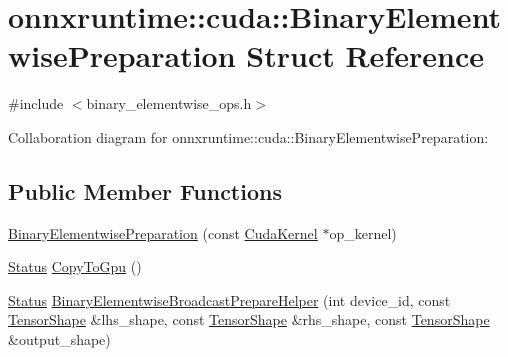 \hypertarget{structonnxruntime_1_1cuda_1_1BinaryElementwisePreparation}{}\section{onnxruntime\+:\+:cuda\+:\+:Binary\+Elementwise\+Preparation Struct Reference}
\label{structonnxruntime_1_1cuda_1_1BinaryElementwisePreparation}


{\ttfamily \#include $<$binary\+\_\+elementwise\+\_\+ops.\+h$>$}



Collaboration diagram for onnxruntime\+:\+:cuda\+:\+:Binary\+Elementwise\+Preparation\+:
\subsection*{Public Member Functions}
\begin{DoxyCompactItemize}
\item 
\mbox{\hyperlink{structonnxruntime_1_1cuda_1_1BinaryElementwisePreparation_a36f2903469519a3db28a5138e610d2a0}{Binary\+Elementwise\+Preparation}} (const \mbox{\hyperlink{classonnxruntime_1_1cuda_1_1CudaKernel}{Cuda\+Kernel}} $\ast$op\+\_\+kernel)
\item 
\mbox{\hyperlink{classonnxruntime_1_1common_1_1Status}{Status}} \mbox{\hyperlink{structonnxruntime_1_1cuda_1_1BinaryElementwisePreparation_ae8057fc5747b8c08a40df19422ca41b0}{Copy\+To\+Gpu}} ()
\item 
\mbox{\hyperlink{classonnxruntime_1_1common_1_1Status}{Status}} \mbox{\hyperlink{structonnxruntime_1_1cuda_1_1BinaryElementwisePreparation_aa0b44414b24d61109e896fb3817c4142}{Binary\+Elementwise\+Broadcast\+Prepare\+Helper}} (int device\+\_\+id, const \mbox{\hyperlink{classonnxruntime_1_1TensorShape}{Tensor\+Shape}} \&lhs\+\_\+shape, const \mbox{\hyperlink{classonnxruntime_1_1TensorShape}{Tensor\+Shape}} \&rhs\+\_\+shape, const \mbox{\hyperlink{classonnxruntime_1_1TensorShape}{Tensor\+Shape}} \&output\+\_\+shape)
\end{DoxyCompactItemize}
